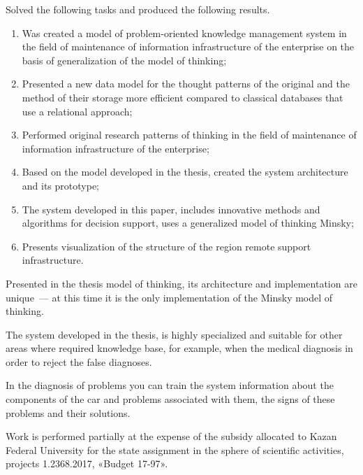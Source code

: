 ﻿%

Solved the following tasks and produced the following results.
\begin{enumerate}
  \item Was created a model of problem-oriented knowledge management system in the field of maintenance of information infrastructure of the enterprise on the basis of generalization of the model of thinking;
  \item Presented a new data model for the thought patterns of the original and the method of their storage more efficient compared to classical databases that use a relational approach;
  \item Performed original research patterns of thinking in the field of maintenance of information infrastructure of the enterprise;
  \item Based on the model developed in the thesis, created the system architecture and its prototype; 
  \item The system developed in this paper, includes innovative methods and algorithms for decision support, uses a generalized model of thinking Minsky;
  \item Presents visualization of the structure of the region remote support infrastructure.
\end{enumerate}

Presented in the thesis model of thinking, its architecture and implementation are unique~--- at this time it is the only implementation of the Minsky model of thinking. \par
The system developed in the thesis, is highly specialized and suitable for other areas where required knowledge base, for example, when the medical diagnosis in order to reject the false diagnoses. \par
In the diagnosis of problems you can train the system information about the components of the car and problems associated with them, the signs of these problems and their solutions. \par
Work is performed partially at the expense of the subsidy allocated to Kazan Federal University for the state assignment in the sphere of scientific activities, projects 1.2368.2017, «Budget 17-97».




